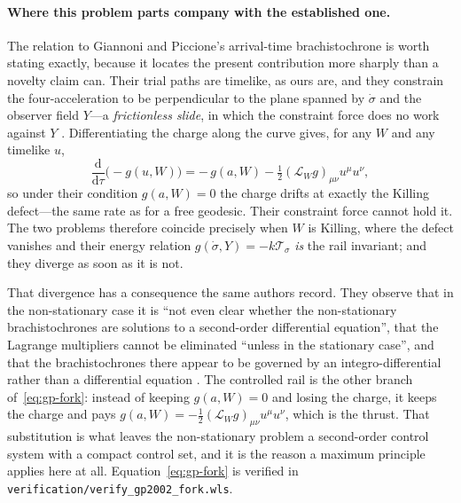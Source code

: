 \documentclass[12pt]{iopart}
\newcommand{\dd}{\mathrm{d}}
\theoremstyle{plain}
\theoremstyle{definition}
\theoremstyle{plain}
\theoremstyle{remark}
\begin{document}
\paragraph{Where this problem parts company with the established one.} The
relation to Giannoni and Piccione's arrival-time brachistochrone
\cite{GiannoniPiccione2002} is worth stating exactly, because it locates the
present contribution more sharply than a novelty claim can. Their trial paths are
timelike, as ours are, and they constrain the four-acceleration to be perpendicular
to the plane spanned by $\dot\sigma$ and the observer field $Y$---a
\emph{frictionless slide}, in which the constraint force does no work against $Y$
\cite[Eqs.~(1.5)--(1.6)]{GiannoniPiccione2002}. Differentiating the charge along
the curve gives, for any $W$ and any timelike $u$,
\begin{equation}
    \frac{\dd}{\dd\tau}\big(\!-g(u,W)\big)
      = -\,g(a,W)-\tfrac12(\mathcal L_Wg)_{\mu\nu}u^\mu u^\nu ,
    \label{eq:gp-fork}
\end{equation}
so under their condition $g(a,W)=0$ the charge drifts at exactly the Killing
defect---the same rate as for a free geodesic. Their constraint force cannot hold
it. The two problems therefore coincide precisely when $W$ is Killing, where the
defect vanishes and their energy relation $g(\dot\sigma,Y)=-k\mathcal T_\sigma$
\cite[Eq.~(1.7)]{GiannoniPiccione2002} \emph{is} the rail invariant; and they
diverge as soon as it is not.

That divergence has a consequence the same authors record. They observe that in the
non-stationary case it is ``not even clear whether the non-stationary
brachistochrones are solutions to a second-order differential equation'', that the
Lagrange multipliers cannot be eliminated ``unless in the stationary case'', and
that the brachistochrones there appear to be governed by an integro-differential
rather than a differential equation \cite[\S1]{GiannoniPiccione2002}. The
controlled rail is the other branch of~\eqref{eq:gp-fork}: instead of keeping
$g(a,W)=0$ and losing the charge, it keeps the charge and pays
$g(a,W)=-\tfrac12(\mathcal L_Wg)_{\mu\nu}u^\mu u^\nu$, which is the thrust. That
substitution is what leaves the non-stationary problem a second-order control
system with a compact control set, and it is the reason a maximum principle applies
here at all. Equation~\eqref{eq:gp-fork} is verified in
\texttt{verification/verify\_gp2002\_fork.wls}.
\end{document}
